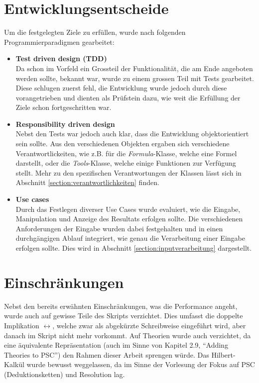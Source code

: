 \documentclass[11pt,a4paper,ngerman]{scrreprt}
\begin{document}
\section{Entwicklungsentscheide} %
Um die festgelegten Ziele zu erfüllen, wurde nach folgenden Programmierparadigmen gearbeitet:
\begin{itemize}
\item \textbf{Test driven design (TDD)} \\
Da schon im Vorfeld ein Grossteil der Funktionalität, die am Ende angeboten werden sollte, bekannt war, wurde zu einem grossen Teil mit Tests gearbeitet. Diese schlugen zuerst fehl, die Entwicklung wurde jedoch durch diese vorangetrieben und dienten als Prüfstein dazu, wie weit die Erfüllung der Ziele schon fortgeschritten war.

\item \textbf{Responsibility driven design} \\
Nebst den Tests war jedoch auch klar, dass die Entwicklung objektorientiert sein sollte. Aus den verschiedenen Objekten ergaben sich verschiedene Verantwortlickeiten, wie z.B. für die \textit{Formula}-Klasse, welche eine Formel darstellt, oder die \textit{Tools}-Klasse, welche einige Funktionen zur Verfügung stellt.
Mehr zu den spezifischen Verantwortungen der Klassen lässt sich in Abschnitt \ref{section:verantwortlichkeiten} finden.

\item \textbf{Use cases} \\
Durch das Festlegen diverser Use Cases wurde evaluiert, wie die Eingabe, Manipulation und Anzeige des Resultats erfolgen sollte. Die verschiedenen Anforderungen der Eingabe wurden dabei festgehalten und in einen durchgängigen Ablauf integriert, wie genau die Verarbeitung einer Eingabe erfolgen sollte. Dies wird in Abschnitt \ref{section:inputverarbeitung} dargestellt.
\end{itemize}

\section{Einschränkungen}
\label{section:einschraenkungen}
Nebst den bereits erwähnten Einschränkungen, was die Performance angeht, wurde auch auf gewisse Teile des Skripts verzichtet. Dies umfasst die doppelte Implikation $\leftrightarrow$, welche zwar als abgekürzte Schreibweise eingeführt wird, aber danach im Skript nicht mehr vorkommt. Auf Theorien wurde auch verzichtet, da eine äquivalente Repräsentation (auch im Sinne von Kapitel 2.9, ``Adding Theories to PSC'') den Rahmen dieser Arbeit sprengen würde. Das Hilbert-Kalkül wurde bewusst weggelassen, da im Sinne der Vorlesung der Fokus auf PSC (Deduktionsketten) und Resolution lag.
\end{document}
